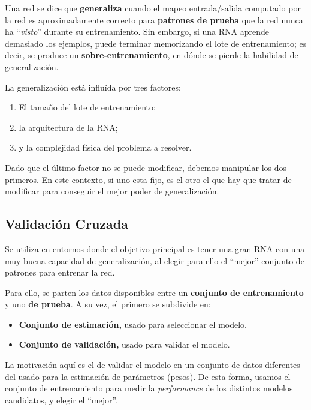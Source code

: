 \documentclass[10pt,a4paper]{article}
\begin{document}
Una red se dice que \textbf{generaliza} cuando el mapeo entrada/salida computado por la red es aproximadamente correcto para \textbf{patrones de prueba} que la red nunca ha ``\textit{visto}'' durante su entrenamiento. Sin embargo, si una RNA aprende demasiado los ejemplos, puede terminar memorizando el lote de entrenamiento; es decir, se produce un \textbf{sobre-entrenamiento}, en dónde se pierde la habilidad de generalización.

La generalización está influída por tres factores:
\begin{enumerate}
\item El tamaño del lote de entrenamiento;
\item la arquitectura de la RNA;
\item y la complejidad física del problema a resolver.
\end{enumerate}

Dado que el último factor no se puede modificar, debemos manipular los dos primeros. En este contexto, si uno esta fijo, es el otro el que hay que tratar de modificar para conseguir el mejor poder de generalización.

\subsection{Validación Cruzada}

Se utiliza en entornos donde el objetivo principal es tener una gran RNA con una muy buena capacidad de generalización, al elegir para ello el ``mejor'' conjunto de patrones para entrenar la red.

Para ello, se parten los datos disponibles entre un \textbf{conjunto de entrenamiento} y uno \textbf{de prueba}. A su vez, el primero se subdivide en:
\begin{itemize}
\item \textbf{Conjunto de estimación,} usado para seleccionar el modelo.
\item \textbf{Conjunto de validación,} usado para validar el modelo.
\end{itemize}

La motivación aquí es el de validar el modelo en un conjunto de datos diferentes del usado para la estimación de parámetros (pesos). De esta forma, usamos el conjunto de entrenamiento para medir la \textit{performance} de los distintos modelos candidatos, y elegir el ``mejor''. 
\end{document}
